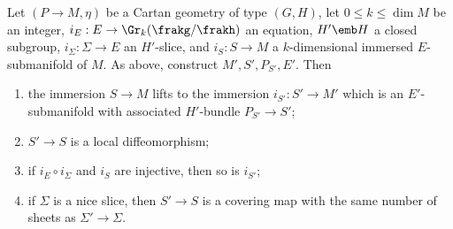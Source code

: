 \begin{thm}
    Let $(P\to M,\eta)$ be a Cartan geometry of type $(G,H)$, let $0\leq k\leq \dim M$ be an integer, $i_E:E\to \Gr_k(\frakg\slash\frakh)$ an equation, $H'\emb H$ a closed subgroup, $i_\varSigma:\varSigma\to E$ an $H'$-slice, and $i_S:S\to M$ a $k$-dimensional immersed $E$-submanifold of $M$. As above, construct $M',S',P_{S'},E'$. Then 
    \begin{enumerate}
        \item the immersion $S\to M$ lifts to the immersion $i_{S'}:S'\to M'$ which is an $E'$-submanifold with associated $H'$-bundle $P_{S'}\to S'$;
        \item  $S'\to S$ is a local diffeomorphism;
        \item if $i_E\circ i_\varSigma$ and $i_S$ are injective, then so is $i_{S'}$;
        \item if $\varSigma$ is a nice slice, then $S'\to S$ is a covering map with the same number of sheets as $\varSigma'\to \varSigma$.
    \end{enumerate}
\end{thm}
